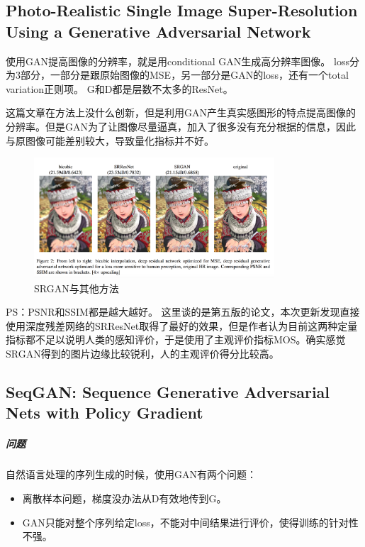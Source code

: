 \documentclass[a4paper]{article}
\begin{document}
\subsection{Photo-Realistic Single Image Super-Resolution Using a Generative Adversarial Network\cite{DBLP:journals/corr/LedigTHCATTWS16}}
使用GAN提高图像的分辨率，就是用conditional GAN生成高分辨率图像。
loss分为3部分，一部分是跟原始图像的MSE，另一部分是GAN的loss，还有一个total variation正则项。
G和D都是层数不太多的ResNet。

这篇文章在方法上没什么创新，但是利用GAN产生真实感图形的特点提高图像的分辨率。但是GAN为了让图像尽量逼真，加入了很多没有充分根据的信息，因此与原图像可能差别较大，导致量化指标并不好。
\begin{figure}
\centering
\includegraphics[width=0.8\textwidth]{./img/23.png}
\caption{SRGAN与其他方法}
\label{fig:23}
\end{figure}
PS：PSNR和SSIM都是越大越好。
这里谈的是第五版的论文，本次更新发现直接使用深度残差网络的SRResNet取得了最好的效果，但是作者认为目前这两种定量指标都不足以说明人类的感知评价，于是使用了主观评价指标MOS。确实感觉SRGAN得到的图片边缘比较锐利，人的主观评价得分比较高。
\subsection{SeqGAN: Sequence Generative Adversarial Nets with Policy Gradient\cite{DBLP:journals/corr/YuZWY16}}
\subparagraph{问题}
自然语言处理的序列生成的时候，使用GAN有两个问题：
\begin{itemize}
\item 离散样本问题，梯度没办法从D有效地传到G。
\item GAN只能对整个序列给定loss，不能对中间结果进行评价，使得训练的针对性不强。
\end{itemize}
\end{document}
